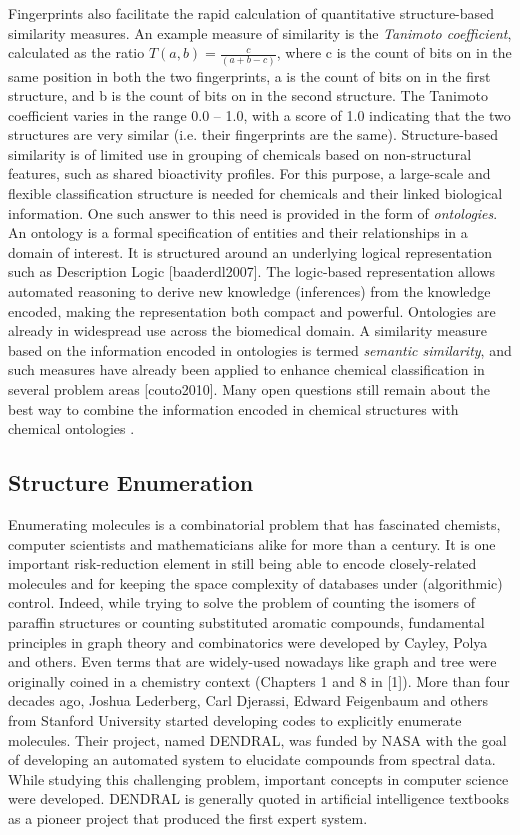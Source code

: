 \documentclass{sig-alternate}
\begin{document}
Fingerprints also facilitate the rapid calculation of quantitative
structure-based similarity measures. An example measure of similarity is the
\emph{Tanimoto coefficient}, calculated as the ratio $T(a,b) = \frac{c}{(a+b−c)}$,
where c is the count of bits on in the same position in both the two
fingerprints, a is the count of bits on in the first structure, and b is the
count of bits on in the second structure. The Tanimoto coefficient varies in the
range 0.0 -- 1.0, with a score of 1.0 indicating that the two structures are very
similar (i.e. their fingerprints are the same). Structure-based similarity is of
limited use in grouping of chemicals based on non-structural features, such as
shared bioactivity profiles. For this purpose, a large-scale and flexible
classification structure is needed for chemicals and their linked biological
information. One such answer to this need is provided in the form of \emph{ontologies}.
An ontology is a formal specification of entities and their relationships in a
domain of interest. It is structured around an underlying logical representation
such as Description Logic [baaderdl2007]. The logic-based representation allows
automated reasoning to derive new knowledge (inferences) from the knowledge
encoded, making the representation both compact and powerful.
Ontologies are already in widespread use across the biomedical domain. A
similarity measure based on the information encoded in ontologies is termed
\emph{semantic similarity}, and such measures have already been applied to enhance
chemical classification in several problem areas [couto2010]. Many open
questions still remain about the best way to combine the information encoded in
chemical structures with chemical ontologies \cite{hastingsowled2010}.

\subsection{Structure Enumeration}
\label{sec:struct-enum}

Enumerating molecules is a combinatorial problem that has fascinated chemists,
computer scientists and mathematicians alike for more than a century. It is one
important risk-reduction element in still being able to encode closely-related
molecules and for keeping the space complexity of databases under (algorithmic)
control. Indeed, while trying to solve the problem of counting the isomers of
paraffin structures or counting substituted aromatic compounds, fundamental
principles in graph theory and combinatorics were developed by Cayley, Polya and
others. Even terms that are widely-used nowadays like graph and tree were
originally coined in a chemistry context (Chapters 1 and 8 in [1]). More than
four decades ago, Joshua Lederberg, Carl Djerassi, Edward Feigenbaum and others
from Stanford University started developing codes to explicitly enumerate
molecules. Their project, named DENDRAL, was funded by NASA with the goal of
developing an automated system to elucidate compounds from spectral data. While
studying this challenging problem, important concepts in computer science were
developed. DENDRAL is generally quoted in artificial intelligence textbooks as a
pioneer project that produced the first expert system.
\end{document}

